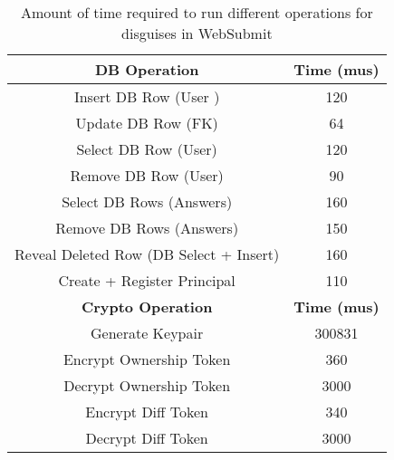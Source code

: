 \begin{table}
\begin{center}
\begin{tabular}{ c c }
    \textbf{DB Operation} & \textbf{Time (mus)}\\
\hline
Insert DB Row (User )& 120\\
Update DB Row (FK) & 64\\ 
Select DB Row (User) & 120\\
Remove DB Row (User) & 90\\
Select DB Rows (Answers) & 160\\
Remove DB Rows (Answers) & 150\\
Reveal Deleted Row (DB Select + Insert) & 160 \\
Create + Register Principal & 110\\
\hline
    \textbf{Crypto Operation} & \textbf{Time (mus)}\\
\hline
Generate Keypair & 300831\\
Encrypt Ownership Token & 360\\
Decrypt Ownership Token & 3000\\
Encrypt Diff Token & 340\\
Decrypt Diff Token & 3000\\
\end{tabular}
\end{center}
\caption{Amount of time required to run different operations for disguises in WebSubmit}
\end{table}
